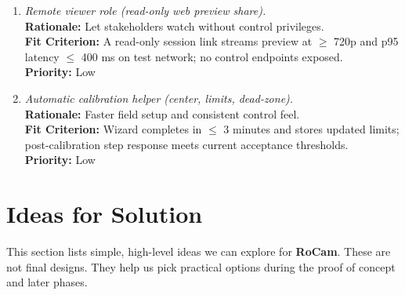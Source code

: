 \documentclass[12pt]{article}
\begin{document}
\begin{enumerate}[label=WTRM \arabic*., wide=0pt, leftmargin=*]
  \item \emph{Remote viewer role (read-only web preview share).}\\[2mm]
        \textbf{Rationale:} Let stakeholders watch without control privileges.\\
        \textbf{Fit Criterion:} A read-only session link streams preview at $\geq$ 720p and p95 latency $\leq$ 400 ms on test network; no control endpoints exposed.\\
        \textbf{Priority:} Low

  \item \emph{Automatic calibration helper (center, limits, dead-zone).}\\[2mm]
        \textbf{Rationale:} Faster field setup and consistent control feel.\\
        \textbf{Fit Criterion:} Wizard completes in $\leq$ 3 minutes and stores updated limits; post-calibration step response meets current acceptance thresholds.\\
        \textbf{Priority:} Low

\end{enumerate}

\section{Ideas for Solution}
\label{sec:ideas-for-solution}

This section lists simple, high-level ideas we can explore for \textbf{RoCam}.
These are not final designs. They help us pick practical options during the
proof of concept and later phases.
\end{document}
